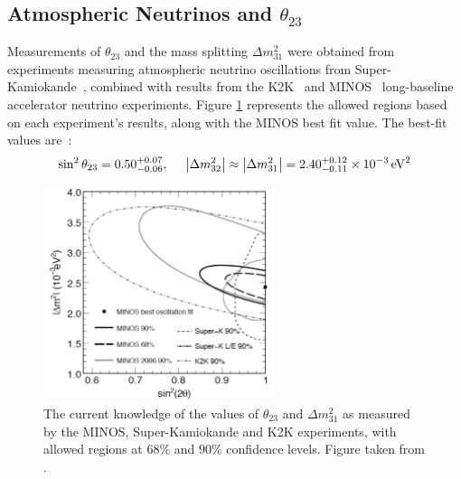 \subsection{Atmospheric Neutrinos and \texorpdfstring{$\theta_{23}$}{θ₂₃}}
Measurements of $\theta_{23}$ and the mass splitting $\Delta m^2_{31}$ were obtained from experiments measuring atmospheric neutrino oscillations from Super-Kamiokande~\citep{SuperK2006}, combined with results from the K2K~\citep{K2K2006} and MINOS~\citep{MINOS2008} long-baseline accelerator neutrino experiments. Figure \ref{fig:theta_23_confidence} represents the allowed regions based on each experiment's results, along with the MINOS best fit value. The best-fit values are~\citep{Mezzetto2010}:
\begin{equation}\label{eqn:atmospheric_parameters}
\sin^2 \theta_{23} = 0.50^{+0.07}_{-0.06}, ~~~~\left|\Delta m^2_{32} \right| \approx \left| \Delta m^2_{31} \right| = 2.40^{+0.12}_{-0.11} \times 10^{-3} \,\mathrm{eV}^2
\end{equation}

\begin{figure}
\centering
\includegraphics[width=0.6\textwidth]{chapters/neutrinophysics_images/theta_23}
\caption[Allowed region for $\theta_{23}$ and $\Delta m^2_{31}$]{\label{fig:theta_23_confidence}The current knowledge of the values of $\theta_{23}$ and $\Delta m^2_{31}$ as measured by the MINOS, Super-Kamiokande and K2K experiments, with allowed regions at $68\%$ and $90\%$ confidence levels. Figure taken from \citep{PDG2011}.}
\end{figure}

